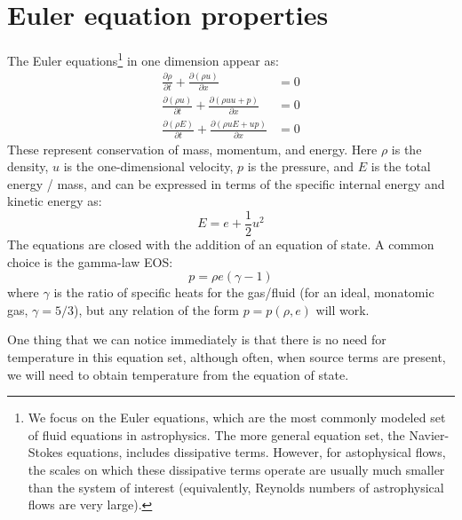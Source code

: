 \label{ch:compressible-theory}


\section{Euler equation properties}

The Euler equations\footnote{ We focus on the Euler equations, which
are the most commonly modeled set of fluid equations in astrophysics.
The more general equation set, the Navier-Stokes equations, includes
dissipative terms.  However, for astophysical flows, the scales on
which these dissipative terms operate are usually much smaller than
the system of interest (equivalently, Reynolds numbers of
astrophysical flows are very large).}  in one dimension appear as:
\begin{align}
\frac{\partial \rho}{\partial t} +
    \frac{\partial (\rho u)}{\partial x} &= 0 \\
%
\frac{\partial(\rho u)}{\partial t} +
    \frac{\partial (\rho uu + p)}{\partial x} &= 0 \\
%
\frac{\partial(\rho E)}{\partial t} +
    \frac{\partial(\rho u E + u p)}{\partial x} &= 0
\end{align}
These represent conservation of mass, momentum, and energy.  Here $\rho$ is the
density, $u$ is the one-dimensional velocity, $p$ is the pressure, and $E$
is the total energy / mass, and can be expressed in terms of the
specific internal energy and kinetic energy as:
\begin{equation}
E = e + \frac{1}{2} u^2
\end{equation}
The equations are closed with the addition of an equation of state.  A common
choice is the gamma-law EOS:
\begin{equation}
p = \rho e(\gamma - 1)
\end{equation}
where $\gamma$ is the ratio of specific heats for the gas/fluid (for
an ideal, monatomic gas, $\gamma = 5/3$), but any relation of the form
$p = p(\rho, e)$ will work.

One thing that we can notice immediately is that there is no need for
temperature in this equation set, although often, when source terms
are present, we will need to obtain temperature from the equation of
state.

